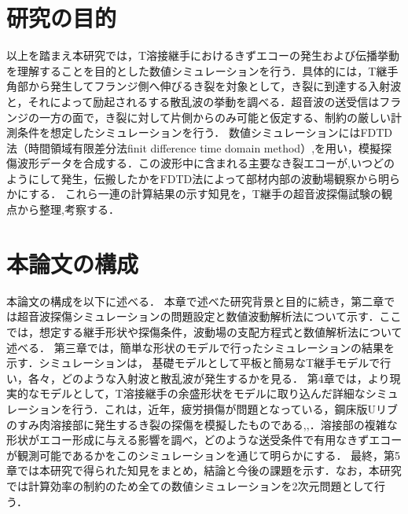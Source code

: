 \section{研究の目的}
以上を踏まえ本研究では，T溶接継手におけるきずエコーの発生および伝播挙動を理解することを目的とした数値シミュレーションを行う．具体的には，T継手角部から発生してフランジ側へ伸びるき裂を対象として，き裂に到達する入射波と，それによって励起されるする散乱波の挙動を調べる．超音波の送受信はフランジの一方の面で，き裂に対して片側からのみ可能と仮定する、制約の厳しい計測条件を想定したシミュレーションを行う．
数値シミュレーションにはFDTD法（時間領域有限差分法finit difference time domain method）\cite{FDTD1},\cite{FDTD2}を用い，模擬探傷波形データを合成する．この波形中に含まれる主要なき裂エコーが,いつどのようにして発生，伝搬したかをFDTD法によって部材内部の波動場観察から明らかにする．
これら一連の計算結果の示す知見を，T継手の超音波探傷試験の観点から整理,考察する．
\section{本論文の構成}
本論文の構成を以下に述べる．
本章で述べた研究背景と目的に続き，第二章では超音波探傷シミュレーションの問題設定と数値波動解析法について示す．ここでは，想定する継手形状や探傷条件，波動場の支配方程式と数値解析法について述べる．
第三章では，簡単な形状のモデルで行ったシミュレーションの結果を示す．シミュレーションは，
基礎モデルとして平板と簡易なT継手モデルで行い，各々，どのような入射波と散乱波が発生するかを見る．
第4章では，より現実的なモデルとして，T溶接継手の余盛形状をモデルに取り込んだ詳細なシミュレーションを行う．これは，近年，疲労損傷が問題となっている，鋼床版Uリブのすみ肉溶接部に発生するき裂の探傷を模擬したものである\cite{Urib1},\cite{Urib2},\cite{Urib3}．溶接部の複雑な形状がエコー形成に与える影響を調べ，どのような送受条件で有用なきずエコーが観測可能であるかをこのシミュレーションを通じて明らかにする．
最終，第5章では本研究で得られた知見をまとめ，結論と今後の課題を示す．なお，本研究では計算効率の制約のため全ての数値シミュレーションを2次元問題として行う．

